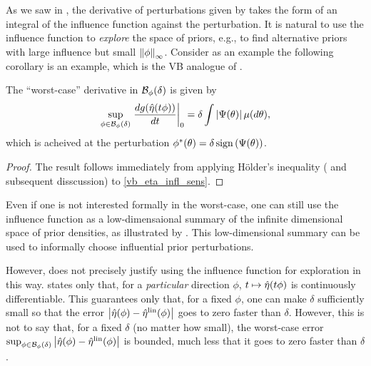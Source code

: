 As we saw in , the derivative of perturbations given
by  takes the form of an integral of the influence
function against the perturbation.  It is natural to use the influence function
to {\em explore} the space of priors, e.g., to find alternative priors with
large influence but small $\left\Vert\phi\right\Vert_{\infty}$.  Consider as an example the
following corollary is an example, which is the VB analogue of \citet[Result
11]{gustafson:1996:local}.



\begin{cor}
%
The ``worst-case'' derivative in $\mathcal{B}_\phi(\delta)$ is given by
%
\begin{align*}
%
\sup_{\phi \in \ball_\phi(\delta)}
    \fracat{d g(\etaopt(\t \phi))}{d \t}{0} =
        \delta \int \abs{\infl(\theta)} \mu(d\theta),
%
\end{align*}
%
which is acheived at the perturbation
$\phi^*(\theta) = \delta \, \mathrm{sign}\left(\Psi(\theta)\right)$.
%
\begin{proof}
%
The result follows immediately from applying H{\"o}lder's inequality
(\citet[Theorem 5.1.2]{dudley:2018:real} and subsequent disscussion)
to \eqref{vb_eta_infl_sens}.
%
\end{proof}
%
\end{cor}


Even if one is not interested formally in the worst-case, one can still use the
influence function as a low-dimensaional summary of the infinite dimensional
space of prior densities, as illustrated by .  This
low-dimensional summary can be used to informally choose influential
prior perturbations.

However,  does not precisely justify using the
influence function for exploration in this way.  
states only that, for a {\em particular} direction $\phi$, $t \mapsto
\hat\eta(t \phi)$ is continuously differentiable.  This guarantees only that,
for a fixed $\phi$, one can make $\delta$ sufficiently small so that the error
$\left|\hat\eta(\phi) - \hat\eta^{\mathrm{lin}}(\phi)\right|$ goes to zero faster than $\delta$.
However, this is not to say that, for a fixed $\delta$ (no matter how small),
the worst-case error $\sup_{\phi \in \mathcal{B}_\phi(\delta)} \left|\hat\eta(\phi) -
\hat\eta^{\mathrm{lin}}(\phi)\right|$ is bounded, much less that it goes to zero faster than $\delta$.

